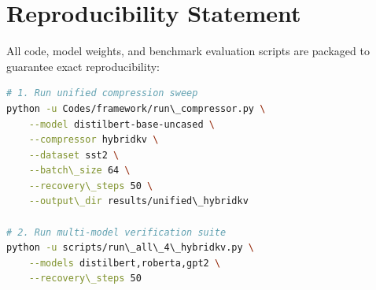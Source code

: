 \section{Reproducibility Statement}
All code, model weights, and benchmark evaluation scripts are packaged to guarantee exact reproducibility:
\begin{lstlisting}[language=bash]
# 1. Run unified compression sweep
python -u Codes/framework/run\_compressor.py \
    --model distilbert-base-uncased \
    --compressor hybridkv \
    --dataset sst2 \
    --batch\_size 64 \
    --recovery\_steps 50 \
    --output\_dir results/unified\_hybridkv

# 2. Run multi-model verification suite
python -u scripts/run\_all\_4\_hybridkv.py \
    --models distilbert,roberta,gpt2 \
    --recovery\_steps 50
\end{lstlisting}

